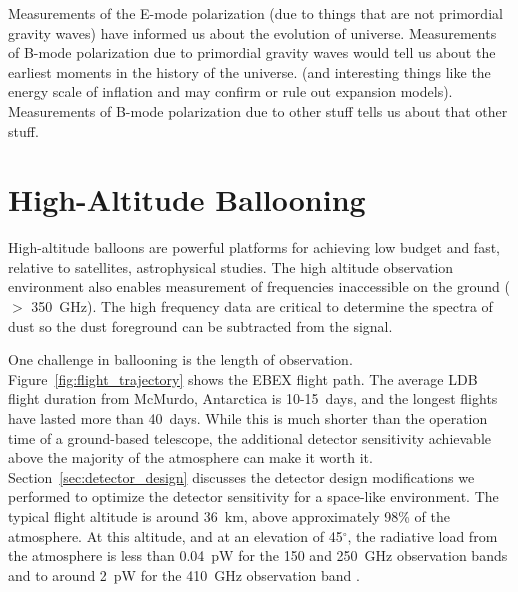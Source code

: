 Measurements of the E-mode polarization (due to things that are not primordial gravity waves) have informed us about the evolution of universe. 
Measurements of B-mode polarization due to primordial gravity waves would tell us about the earliest moments in the history of the universe. (and interesting things like the energy scale of inflation and may confirm or rule out expansion models).
Measurements of B-mode polarization due to other stuff tells us about that other stuff. 


\section{High-Altitude Ballooning}
\label{sec:balloons}


High-altitude balloons are powerful platforms for achieving low budget and fast, relative to satellites, astrophysical studies. 
The high altitude observation environment also enables measurement of frequencies inaccessible on the ground ($>$ 350~GHz). The high frequency data are critical to determine the spectra of dust so the dust foreground can be subtracted from the signal. 

One challenge in ballooning is the length of observation. 
Figure~\ref{fig:flight_trajectory} shows the \ac{EBEX} flight path. 
The average \ac{LDB} flight duration from McMurdo, Antarctica is 10-15~days, and the longest flights have lasted more than 40~days.  
While this is much shorter than the operation time of a ground-based telescope, the additional detector sensitivity achievable above the majority of the atmosphere can make it worth it. 
Section~\ref{sec:detector_design} discusses the detector design modifications we performed to optimize the detector sensitivity for a space-like environment. 
The typical flight altitude is around 36~km, above approximately 98\% of the atmosphere. 
At this altitude, and at an elevation of 45$^\circ$, the radiative load from the atmosphere is less than 0.04~pW for the 150 and 250~GHz observation bands and to around 2~pW for the 410~GHz observation band \cite{Bao2015}. 

